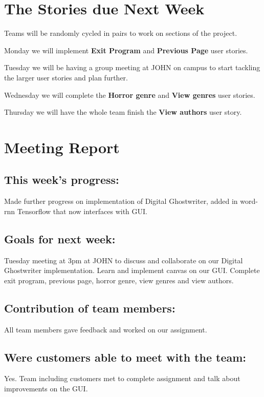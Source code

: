 \documentclass[12pt]{article}
\begin{document}
\newpage

\section{The Stories due Next Week }

Teams will be randomly cycled in pairs to work on sections of the project.

Monday we will implement \textbf{Exit Program} and \textbf{Previous Page} user stories.

Tuesday we will be having a group meeting at JOHN on campus to start tackling the larger user stories and plan further.

Wednesday we will complete the \textbf{Horror genre}
and \textbf{View genres} user stories.

Thursday we will have the whole team finish the \textbf{View authors} user story.

\section{Meeting Report }

\subsection{This week's progress:}
Made further progress on implementation of Digital Ghostwriter, added in word-rnn Tensorflow that now interfaces with GUI.

\subsection{Goals for next week:}
Tuesday meeting at 3pm at JOHN to discuss and collaborate on our Digital Ghostwriter implementation. Learn and implement canvas on our GUI. Complete exit program, previous page, horror genre, view genres and view authors.

\subsection{Contribution of team members:}
All team members gave feedback and worked on our assignment.

\subsection{Were customers able to meet with the team:}
Yes. Team including customers met to complete assignment and talk about improvements on the GUI.
\end{document}
